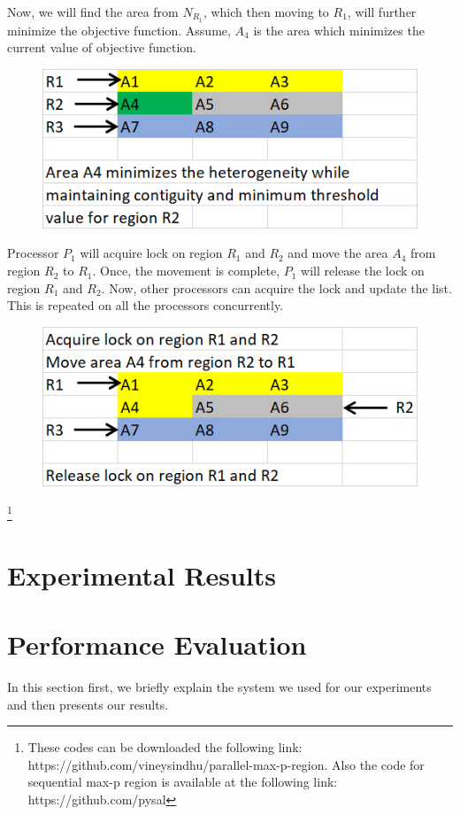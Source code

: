 \documentclass[conference]{IEEEtran}
\begin{document}
Now, we will find the area from $N_{R_1}$, which then moving to $R_1$, will
further minimize the objective function. Assume, $A_4$ is the area which
minimizes the current value of objective function. \\

\begin{figure}[h]
\includegraphics[scale=0.85]{o3.png}
\end{figure}

Processor $P_1$ will acquire lock on region $R_1$ and $R_2$ and move the area $A_4$ from region $R_2$ to
$R_1$. Once, the movement is complete, $P_1$ will release the lock on region $R_1$ and $R_2$. Now, other processors can acquire the lock and update the list. This is repeated on all the processors concurrently. \\

\begin{figure}[h]
\includegraphics[scale=0.85]{o4.png}
\end{figure}

\footnote{These codes can be downloaded the following link: https://github.com/vineysindhu/parallel-max-p-region.
Also the code for sequential max-p region is available at the following link: https://github.com/pysal}

\section{Experimental Results}
\section{Performance Evaluation}
In this section first, we briefly explain the system we used for our experiments and then presents our results.
\end{document}
